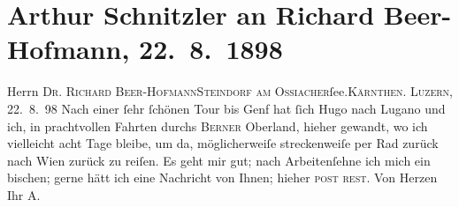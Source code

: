 

         
         \renewcommand{\erwaehntePersonen}{Personen: Richard Beer-Hofmann, Hugo von Hofmannsthal}
         \renewcommand{\erwaehnteOrte}{Orte: Berner Oberland, Genf, Kärnten, Lugano, Luzern, Steindorf am Ossiacher See, Wien}
         \renewcommand{\erwaehnteWerke}{}
               \section[Arthur Schnitzler an Richard Beer-Hofmann, 22. 8. 1898]{ Arthur Schnitzler an Richard Beer-Hofmann, 22. 8. 1898}\nopagebreak{}\rehead{ }\begin{ledgroupsized}[t]{13cm}\normalsize\beginnumbering{} \toendnotes[C]{\smallbreak\pagebreak[2]} 
\pstart{}{\pb}Herrn \textsc{Dr. Richard
                     Beer-Hofmann}\pend{}\pstart{}\textsc{Steindorf am Ossiacher}ſee.\pend{}\pstart{}\textsc{Kärnthen}.\pend{}{\bigskip}\pstart
           \raggedleft{}{\pb}\textsc{Luzern}, 22. 8. 98\pend
           \pstart
           Nach einer ſehr ſchönen Tour bis Genf hat ſich
                  Hugo nach Lugano und ich, in prachtvollen Fahrten durchs \textsc{Berner} Oberland, hieher gewandt, wo ich vielleicht
               acht Tage bleibe, um da{\geminationn}, möglicherweiſe streckenweiſe
               per Rad zurück nach Wien zurück zu reiſen. Es geht
               mir gut; nach Arbeit\introOben{}en\introOben{}{ }ſehne ich mich ein bischen; gerne hätt ich eine
               Nachricht von Ihnen; hieher \textsc{post rest}. Von Herzen Ihr
                  \spacefill\mbox{A.}\pend
           
         
         \endnumbering{}\end{ledgroupsized}  \newcommand{\dateiname}{L00836}\newcommand{\titel}{Arthur Schnitzler an Richard Beer-Hofmann, 22. 8. 1898}\newcommand{\editorInnen}{Martin Anton Müller und Gerd-Hermann Susen}
      